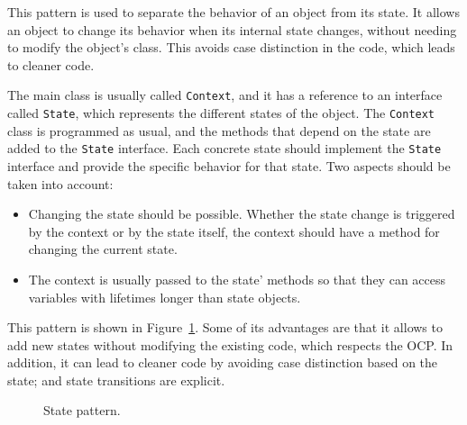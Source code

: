 This pattern is used to separate the behavior of an object from its state. It allows an object to change its behavior when its internal state changes, without needing to modify the object's class. This avoids case distinction in the code, which leads to cleaner code.

The main class is usually called \texttt{Context}, and it has a reference to an interface called \texttt{State}, which represents the different states of the object. The \texttt{Context} class is programmed as usual, and the methods that depend on the state are added to the \texttt{State} interface. Each concrete state should implement the \texttt{State} interface and provide the specific behavior for that state. Two aspects should be taken into account:
\begin{itemize}
    \item Changing the state should be possible. Whether the state change is triggered by the context or by the state itself, the context should have a method for changing the current state.
    \item The context is usually passed to the state' methods so that they can access variables with lifetimes longer than state objects.
\end{itemize}

This pattern is shown in Figure~\ref{fig:state}. Some of its advantages are that it allows to add new states without modifying the existing code, which respects the OCP. In addition, it can lead to cleaner code by avoiding case distinction based on the state; and state transitions are explicit.
\begin{figure}
    \centering
    \caption{State pattern.}
    \label{fig:state}
\end{figure}


